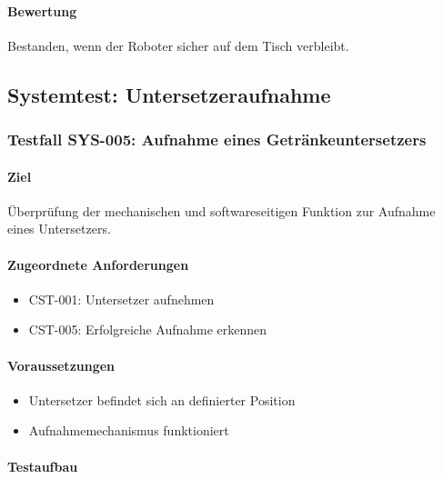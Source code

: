 \documentclass[
  a4paper,
  12pt,
  DIV=12,        %
  parskip=half,  %
  headings=small %
]{scrartcl}
\theoremstyle{definition}
\providecommand{\tightlist}{%
  \setlength{\itemsep}{0pt}\setlength{\parskip}{0pt}}
\theoremstyle{definition}
\begin{document}
\paragraph{Bewertung}\label{bewertung-27}

Bestanden, wenn der Roboter sicher auf dem Tisch verbleibt.

\subsection{Systemtest:
Untersetzeraufnahme}\label{systemtest-untersetzeraufnahme}

\subsubsection{Testfall SYS-005: Aufnahme eines
Getränkeuntersetzers}\label{testfall-sys-005-aufnahme-eines-getruxe4nkeuntersetzers}

\paragraph{Ziel}\label{ziel-28}

Überprüfung der mechanischen und softwareseitigen Funktion zur Aufnahme
eines Untersetzers.

\paragraph{Zugeordnete
Anforderungen}\label{zugeordnete-anforderungen-28}

\begin{itemize}
\tightlist
\item
  CST-001: Untersetzer aufnehmen
\item
  CST-005: Erfolgreiche Aufnahme erkennen
\end{itemize}

\paragraph{Voraussetzungen}\label{voraussetzungen-27}

\begin{itemize}
\tightlist
\item
  Untersetzer befindet sich an definierter Position
\item
  Aufnahmemechanismus funktioniert
\end{itemize}

\paragraph{Testaufbau}\label{testaufbau-4}
\end{document}

